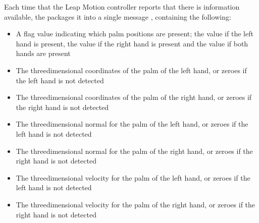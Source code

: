\primaryEnd
{}
Each time that the Leap Motion controller reports that there is information available,
the  packages it into a single message
\openSq{}\closeSq, containing the following:
\begin{itemize}
\item A flag value indicating which palm positions are present; the value  if
the left hand is present, the value  if the right hand is present and the value
 if both hands are present
\item\exSp{}The three\longDash{}dimensional coordinates of the palm of the left hand, or
zeroes if the left hand is not detected
\item\exSp{}The three\longDash{}dimensional coordinates of the palm of the right hand, or
zeroes if the right hand is not detected
\item\exSp{}The three\longDash{}dimensional normal for the palm of the left hand, or
zeroes if the left hand is not detected
\item\exSp{}The three\longDash{}dimensional normal for the palm of the right hand, or
zeroes if the right hand is not detected
\item\exSp{}The three\longDash{}dimensional velocity for the palm of the left hand, or
zeroes if the left hand is not detected
\item\exSp{}The three\longDash{}dimensional velocity for the palm of the right hand, or
zeroes if the right hand is not detected
\end{itemize}
\primaryEnd{}
